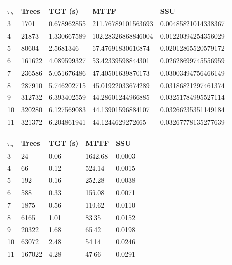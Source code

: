 \documentclass[12pt]{article}
\begin{document}
\iffalse
\begin{center}
	\begin{tabular}{|l|l|l|l|l|}
	\hline
    $\tau_h$  & Trees   & TGT (s) & MTTF   & SSU    \\ \hline
	3	&	1701	&	0.678962855	&	211.76789101563693	&	0.00485821014338367	\\ \hline
	4	&	21873	&	1.330667589	&	102.28326868846004	&	0.01220394254356029	\\ \hline
	5	&	80604	&	2.5681346	&	67.47691830610874	&	0.02012865520579172	\\ \hline
	6	&	161622	&	4.089599327	&	53.42339598844301	&	0.02628699745556959	\\ \hline
	7	&	236586	&	5.051676486	&	47.40501639870173	&	0.03003494756466149	\\ \hline
	8	&	287910	&	5.746202715	&	45.01922033674289	&	0.03186821297461374	\\ \hline
	9	&	312732	&	6.393402559	&	44.28601244966885	&	0.03251784995527114	\\ \hline
	10	&	320280	&	6.127569083	&	44.13901596884107	&	0.03266235351149184	\\ \hline
	11	&	321372	&	6.204861941	&	44.1244629272665	&	0.03267778135277639 \\ \hline
    \end{tabular}
\end{center}

\begin{center}
	\begin{tabular}{|l|l|l|l|l|}
	\hline
    $\tau_n$  & Trees   & TGT (s) & MTTF   & SSU    \\ \hline
    3	&	24	&	0.06	&	1642.68	&	0.0003	\\ \hline
	4	&	66	&	0.12	&	524.14	&	0.0015	\\ \hline
	5	&	192	&	0.16	&	252.28	&	0.0038	\\ \hline
	6	&	588	&	0.33	&	156.08	&	0.0071	\\ \hline
	7	&	1875	&	0.56	&	110.62	&	0.0110	\\ \hline
	8	&	6165	&	1.01	&	83.35	&	0.0152	\\ \hline
	9	&	20322	&	1.68	&	65.42	&	0.0198	\\ \hline
	10	&	63072	&	2.48	&	54.14	&	0.0246	\\ \hline
	11	&	167022	&	4.28	&	47.66	&	0.0291	\\ \hline
    \end{tabular}
\end{center}
\end{document}
